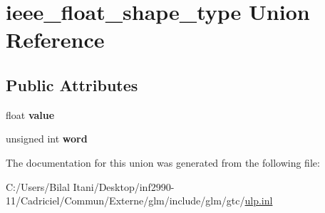 \hypertarget{unionieee__float__shape__type}{}\section{ieee\+\_\+float\+\_\+shape\+\_\+type Union Reference}
\label{unionieee__float__shape__type}
\subsection*{Public Attributes}
\begin{DoxyCompactItemize}
\item 
float {\bfseries value}\hypertarget{unionieee__float__shape__type_aa0c47451f1b974421cbb9e2833ddb68e}{}\label{unionieee__float__shape__type_aa0c47451f1b974421cbb9e2833ddb68e}

\item 
unsigned int {\bfseries word}\hypertarget{unionieee__float__shape__type_a49230c21acd672d044f38b1abcbd6071}{}\label{unionieee__float__shape__type_a49230c21acd672d044f38b1abcbd6071}

\end{DoxyCompactItemize}


The documentation for this union was generated from the following file\+:\begin{DoxyCompactItemize}
\item 
C\+:/\+Users/\+Bilal Itani/\+Desktop/inf2990-\/11/\+Cadriciel/\+Commun/\+Externe/glm/include/glm/gtc/\hyperlink{ulp_8inl}{ulp.\+inl}\end{DoxyCompactItemize}
